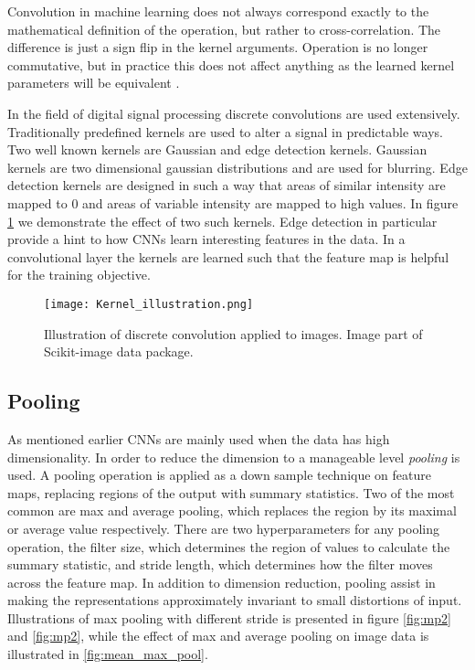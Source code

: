 \documentclass[../../thesis.tex]{subfiles}
\begin{document}
Convolution in machine learning does not always correspond exactly to the mathematical definition of the operation, but rather to cross-correlation. The difference is just a sign flip in the kernel arguments. Operation is no longer commutative, but in practice this does not affect anything as the learned kernel parameters will be equivalent \cite{deeplearningbook}.\newline

In the field of digital signal processing discrete convolutions are used extensively. Traditionally predefined kernels are used to alter a signal in predictable ways. Two well known kernels are Gaussian and edge detection kernels. Gaussian kernels are two dimensional gaussian distributions and are used for blurring. Edge detection kernels are designed in such a way that areas of similar intensity are mapped to $0$ and areas of variable intensity are mapped to high values. In figure \ref{fig:kernelIllustration} we demonstrate the effect of two such kernels. Edge detection in particular provide a hint to how CNNs learn interesting features in the data. In a convolutional layer the kernels are learned such that the feature map is helpful for the training objective. 
\begin{figure}[h]
    \centering
    \texttt{[image: Kernel\_illustration.png]}
    \caption{Illustration of discrete convolution applied to images. Image part of Scikit-image data package.}
    \label{fig:kernelIllustration}
\end{figure}

\subsection{Pooling}
As mentioned earlier CNNs are mainly used when the data has high dimensionality. In order to reduce the dimension to a manageable level \textit{pooling} is used. A pooling operation is applied as a down sample technique on feature maps, replacing regions of the output with summary statistics. Two of the most common are max and average pooling, which replaces the region by its maximal or average value respectively. There are two hyperparameters for any pooling operation, the filter size, which determines the region of values to calculate the summary statistic, and stride length, which determines how the filter moves across the feature map. In addition to dimension reduction, pooling assist in making the representations approximately invariant to small distortions of input. Illustrations of max pooling with different stride is presented in figure \ref{fig:mp2} and \ref{fig:mp2}, while the effect of max and average pooling on image data is illustrated in \ref{fig:mean_max_pool}.
\end{document}
